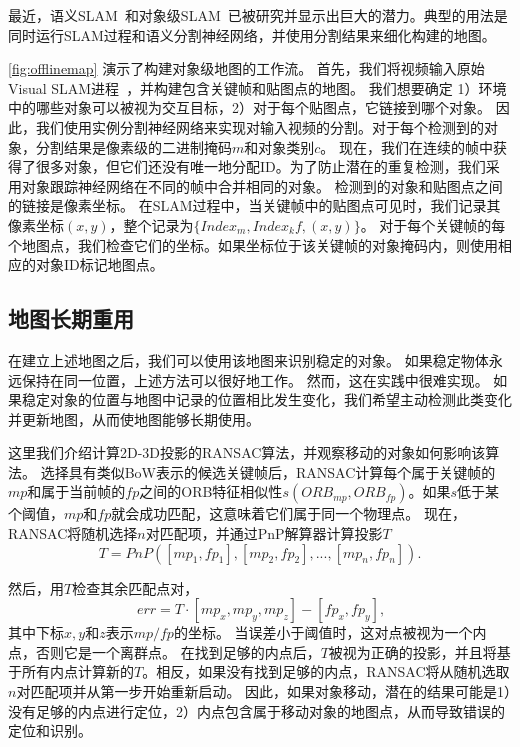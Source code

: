 最近，语义SLAM~\cite{bowman2017probabilistic,kaneko2018mask}和对象级SLAM~\cite{mccormac2018fusion++,strecke2019fusion}已被研究并显示出巨大的潜力。典型的用法是同时运行SLAM过程和语义分割神经网络，并使用分割结果来细化构建的地图。

\autoref{fig:offlinemap} 演示了构建对象级地图的工作流。
首先，我们将视频输入原始Visual SLAM进程~\cite{mur2017orb}，并构建包含关键帧和贴图点的地图。
我们想要确定 1）环境中的哪些对象可以被视为交互目标，2）对于每个贴图点，它链接到哪个对象。
因此，我们使用实例分割神经网络\cite{He_2017_ICCV}来实现对输入视频的分割。对于每个检测到的对象，分割结果是像素级的二进制掩码$m$和对象类别$c$。
现在，我们在连续的帧中获得了很多对象，但它们还没有唯一地分配ID。为了防止潜在的重复检测，我们采用对象跟踪神经网络在不同的帧中合并相同的对象。
检测到的对象和贴图点之间的链接是像素坐标。
在SLAM过程中，当关键帧中的贴图点可见时，我们记录其像素坐标$(x,y)$，整个记录为$\{Index_m, Index_kf, (x,y)\}$。
对于每个关键帧的每个地图点，我们检查它们的坐标。如果坐标位于该关键帧的对象掩码内，则使用相应的对象ID标记地图点。

\subsection{地图长期重用}
在建立上述地图之后，我们可以使用该地图来识别稳定的对象。
如果稳定物体永远保持在同一位置，上述方法可以很好地工作。
然而，这在实践中很难实现。
如果稳定对象的位置与地图中记录的位置相比发生变化，我们希望主动检测此类变化并更新地图，从而使地图能够长期使用。

这里我们介绍计算2D-3D投影的RANSAC\cite{derpanis2010overview}算法，并观察移动的对象如何影响该算法。
选择具有类似BoW表示的候选关键帧后，RANSAC计算每个属于关键帧的$mp$和属于当前帧的$fp$之间的ORB特征相似性$s(ORB_{mp}, ORB_{fp})$。如果$s$低于某个阈值，$mp$和$fp$就会成功匹配，这意味着它们属于同一个物理点。
现在，RANSAC将随机选择$n$对匹配项，并通过PnP解算器计算投影$T$
\begin{equation}\label{equ:pnp}
    T = PnP([mp_1, fp_1],[mp_2, fp_2], ..., [mp_n, fp_n]).
\end{equation} 

然后，用$T$检查其余匹配点对，
\begin{equation}\label{equ:check}
    \
    err = T \cdot [mp_x, mp_y, mp_z] - [fp_x, fp_y],
\end{equation} 
其中下标$x,y$和$z$表示$mp/fp$的坐标。
当误差小于阈值时，这对点被视为一个内点，否则它是一个离群点。
在找到足够的内点后，$T$被视为正确的投影，并且将基于所有内点计算新的$T$。相反，如果没有找到足够的内点，RANSAC将从随机选取$n$对匹配项并从第一步开始重新启动。
因此，如果对象移动，潜在的结果可能是1）没有足够的内点进行定位，2）内点包含属于移动对象的地图点，从而导致错误的定位和识别。

